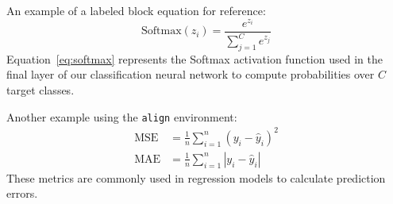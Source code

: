 An example of a labeled block equation for reference:
\begin{equation}
    \text{Softmax}(z_i) = \frac{e^{z_i}}{\sum_{j=1}^{C} e^{z_j}}
    \label{eq:softmax}
\end{equation}
Equation~\ref{eq:softmax} represents the Softmax activation function used in the final layer of our classification neural network to compute probabilities over $C$ target classes.

Another example using the \texttt{align} environment:
\begin{align}
    \text{MSE} &= \frac{1}{n} \sum_{i=1}^{n} (y_i - \hat{y}_i)^2 \\
    \text{MAE} &= \frac{1}{n} \sum_{i=1}^{n} |y_i - \hat{y}_i|
\end{align}
These metrics are commonly used in regression models to calculate prediction errors.
